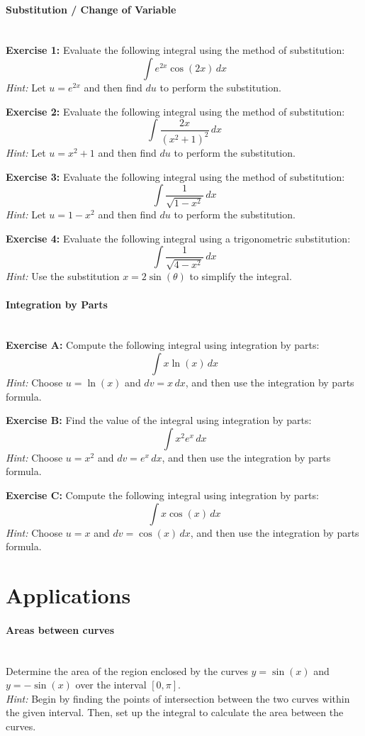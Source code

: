 \documentclass[]{article}
\begin{document}
	\paragraph{Substitution / Change of Variable}\mbox{}\\
	\textbf{Exercise 1:}
	Evaluate the following integral using the method of substitution:
	\[
	\int e^{2x} \cos(2x) \, dx
	\]
	\textit{Hint:} Let \( u = e^{2x} \) and then find \( du \) to perform the substitution.
	
	\textbf{Exercise 2:}
	Evaluate the following integral using the method of substitution:
	\[
	\int \frac{2x}{(x^2 + 1)^2} \, dx
	\]
	\textit{Hint:} Let \( u = x^2 + 1 \) and then find \( du \) to perform the substitution.
	
	\textbf{Exercise 3:}
	Evaluate the following integral using the method of substitution:
	\[
	\int \frac{1}{\sqrt{1 - x^2}} \, dx
	\]
	\textit{Hint:} Let \( u = 1 - x^2 \) and then find \( du \) to perform the substitution.
	
	\textbf{Exercise 4:}
	Evaluate the following integral using a trigonometric substitution:
	\[
	\int \frac{1}{\sqrt{4 - x^2}} \, dx
	\]
	\textit{Hint:} Use the substitution \(x = 2\sin(\theta)\) to simplify the integral.
	
	
	\paragraph{Integration by Parts}\mbox{}\\
	\textbf{Exercise A:}
	Compute the following integral using integration by parts:
	\[
	\int x \ln(x) \, dx
	\]
	\textit{Hint:} Choose \( u = \ln(x) \) and \( dv = x \, dx \), and then use the integration by parts formula.
	
	\textbf{Exercise B:}
	Find the value of the integral using integration by parts:
	\[
	\int x^2 e^x \, dx
	\]
	\textit{Hint:} Choose \( u = x^2 \) and \( dv = e^x \, dx \), and then use the integration by parts formula.
	
	\textbf{Exercise C:}
	Compute the following integral using integration by parts:
	\[
	\int x \cos(x) \, dx
	\]
	\textit{Hint:} Choose \( u = x \) and \( dv = \cos(x) \, dx \), and then use the integration by parts formula.
	
	
	\section{Applications}
	\paragraph{Areas between curves}\mbox{}\\
	Determine the area of the region enclosed by the curves \(y = \sin(x)\) and \(y = -\sin(x)\) over the interval \([0, \pi]\).\\
	\textit{Hint:} Begin by finding the points of intersection between the two curves within the given interval.
	Then, set up the integral to calculate the area between the curves.
	
\end{document}

